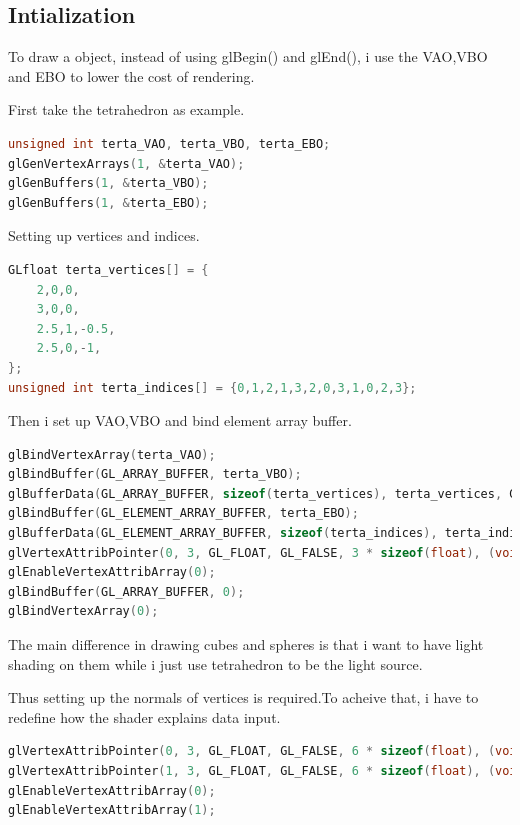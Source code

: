 \documentclass[acmtog]{acmart}
\begin{document}
\subsection{Intialization}
To draw a object, instead of using glBegin() and glEnd(), i use the VAO,VBO and EBO to lower the cost of rendering.\par First take the tetrahedron as example.
\begin{lstlisting}[frame=single,breaklines=true,language=c++,basicstyle=\footnotesize\ttfamily]
unsigned int terta_VAO, terta_VBO, terta_EBO;
glGenVertexArrays(1, &terta_VAO);
glGenBuffers(1, &terta_VBO);
glGenBuffers(1, &terta_EBO);
\end{lstlisting}
\par Setting up vertices and indices.
\begin{lstlisting}[frame=single,breaklines=true,language=c++,basicstyle=\footnotesize\ttfamily]
GLfloat terta_vertices[] = {
	2,0,0,
	3,0,0,
	2.5,1,-0.5,
	2.5,0,-1,
};
unsigned int terta_indices[] = {0,1,2,1,3,2,0,3,1,0,2,3};
\end{lstlisting}
\par Then  i set up VAO,VBO and bind element array buffer.
\begin{lstlisting}[frame=single,breaklines=true,language=c++,basicstyle=\footnotesize\ttfamily]
glBindVertexArray(terta_VAO);
glBindBuffer(GL_ARRAY_BUFFER, terta_VBO);
glBufferData(GL_ARRAY_BUFFER, sizeof(terta_vertices), terta_vertices, GL_STATIC_DRAW);
glBindBuffer(GL_ELEMENT_ARRAY_BUFFER, terta_EBO);
glBufferData(GL_ELEMENT_ARRAY_BUFFER, sizeof(terta_indices), terta_indices, GL_STATIC_DRAW);
glVertexAttribPointer(0, 3, GL_FLOAT, GL_FALSE, 3 * sizeof(float), (void*)0);
glEnableVertexAttribArray(0);
glBindBuffer(GL_ARRAY_BUFFER, 0);
glBindVertexArray(0);
\end{lstlisting}
\par The main difference in drawing cubes and spheres is that i want to have light shading on them while i just use tetrahedron to be the light source.\par Thus setting up the normals of vertices is required.To acheive that, i have to redefine how the shader explains data input.
\begin{lstlisting}[frame=single,breaklines=true,language=c++,basicstyle=\footnotesize\ttfamily]
glVertexAttribPointer(0, 3, GL_FLOAT, GL_FALSE, 6 * sizeof(float), (void*)0);
glVertexAttribPointer(1, 3, GL_FLOAT, GL_FALSE, 6 * sizeof(float), (void*)(3 * sizeof(float)));
glEnableVertexAttribArray(0);
glEnableVertexAttribArray(1);
\end{lstlisting}
\end{document}
